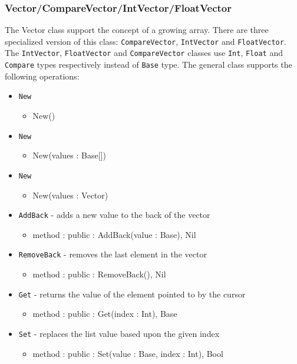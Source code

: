 \documentclass[12pt]{article}
\begin{document}
\subsubsection{Vector/CompareVector/IntVector/FloatVector}
The Vector class support the concept of a growing array.  There are three specialized version of this class: \texttt{CompareVector}, \texttt{IntVector} and \texttt{FloatVector}.  The \texttt{IntVector}, \texttt{FloatVector} and \texttt{CompareVector} classes use \texttt{Int}, \texttt{Float} and \texttt{Compare} types respectively instead of \texttt{Base} type.  The general class supports the following operations:
\begin{itemize}
    \item \texttt{New}
    	\begin{itemize}
	\item New()
	\end{itemize}
    \item \texttt{New}
    	\begin{itemize}
	\item New(values : Base[])
	\end{itemize}
    \item \texttt{New}
    	\begin{itemize}
	\item New(values : Vector)
	\end{itemize}
    \item \texttt{AddBack} - adds a new value to the back of the vector
    	\begin{itemize}
	\item method : public : AddBack(value : Base), Nil
	\end{itemize}
    \item \texttt{RemoveBack} - removes the last element in the vector
    	\begin{itemize}
	\item method : public : RemoveBack(), Nil
	\end{itemize}
    \item \texttt{Get} - returns the value of the element  pointed to by the cursor
    	\begin{itemize}
	\item method : public : Get(index : Int), Base
	\end{itemize}
    \item \texttt{Set} - replaces the list value based upon the given index
    	\begin{itemize}
	\item method : public : Set(value : Base, index : Int), Bool

\end{itemize}
\end{itemize}
\end{document}
